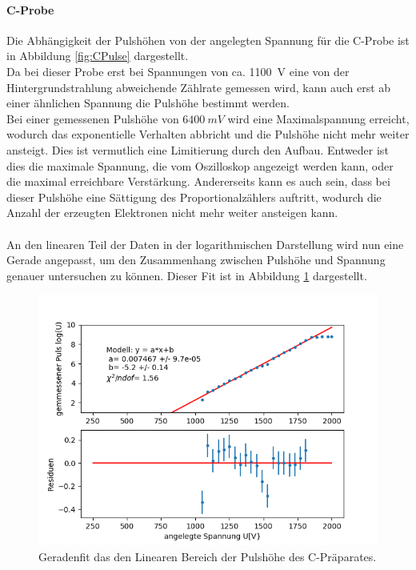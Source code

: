 \documentclass[12pt,a4paper]{article}
\begin{document}
\paragraph{C-Probe}
Die Abhängigkeit der Pulshöhen von der angelegten Spannung für die C-Probe ist in Abbildung \ref{fig:CPulse} dargestellt.\\
Da bei dieser Probe erst bei Spannungen von ca. \SI{1100}{V} eine von der Hintergrundstrahlung abweichende Zählrate gemessen wird, kann auch erst ab einer ähnlichen Spannung die Pulshöhe bestimmt werden.\\
Bei einer gemessenen Pulshöhe von $\SI{6400}{mV}$ wird eine Maximalspannung erreicht, wodurch das exponentielle Verhalten abbricht und die Pulshöhe nicht mehr weiter ansteigt. Dies ist vermutlich eine Limitierung durch den Aufbau. Entweder ist dies die maximale Spannung, die vom Oszilloskop angezeigt werden kann, oder die maximal erreichbare Verstärkung. Andererseits kann es auch sein, dass bei dieser Pulshöhe eine Sättigung des Proportionalzählers auftritt, wodurch die Anzahl der erzeugten Elektronen nicht mehr weiter ansteigen kann.\\
\\
An den linearen Teil der Daten in der logarithmischen Darstellung wird nun eine Gerade angepasst, um den Zusammenhang zwischen Pulshöhe und Spannung genauer untersuchen zu können. Dieser Fit ist in Abbildung \ref{fig:CPulsfit} dargestellt.\\

\begin{figure}
\centering
\includegraphics[scale=0.8]{Bilder/Prop/C_Pulsfit.PNG}
\caption{Geradenfit das den Linearen Bereich der Pulshöhe des C-Präparates.}
\label{fig:CPulsfit}
\end{figure}
\end{document}
